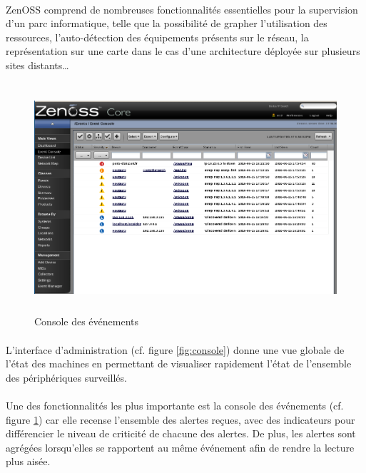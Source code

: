 \documentclass[12pt,a4paper,notitlepage]{article}
\begin{document}
\paragraph{} ZenOSS comprend de nombreuses fonctionnalités essentielles pour la supervision d'un parc informatique, telle que la possibilité de grapher l'utilisation des ressources, l'auto-détection des équipements présents sur le réseau, la représentation sur une carte dans le cas d'une architecture déployée sur plusieurs sites distants\ldots
\begin{figure}[!h]
\begin{center}
\includegraphics[height=8.5cm]{zenoss_console}
\caption{Console des événements}
\label{fig:events}
\end{center}
\end{figure}

\paragraph{} L'interface d'administration (cf. figure \ref{fig:console}) donne une vue globale de l'état des machines en permettant de visualiser rapidement l'état de l'ensemble des périphériques surveillés. 


\paragraph{} Une des fonctionnalités les plus importante est la console des événements (cf. figure \ref{fig:events}) car elle recense l'ensemble des alertes reçues, avec des indicateurs pour différencier le niveau de criticité de chacune des alertes. De plus, les alertes sont agrégées lorsqu'elles se rapportent au même événement afin de rendre la lecture plus aisée.
\end{document}
